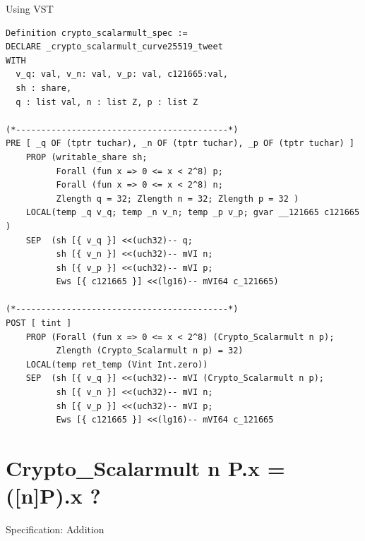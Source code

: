 \documentclass[8pt]{beamer}
\begin{document}
\begin{frame}[fragile]{Using VST}
\begin{lstlisting}[language=CoqVST]
Definition crypto_scalarmult_spec :=
DECLARE _crypto_scalarmult_curve25519_tweet
WITH
  v_q: val, v_n: val, v_p: val, c121665:val,
  sh : share,
  q : list val, n : list Z, p : list Z

(*------------------------------------------*)
PRE [ _q OF (tptr tuchar), _n OF (tptr tuchar), _p OF (tptr tuchar) ]
    PROP (writable_share sh;
          Forall (fun x => 0 <= x < 2^8) p;
          Forall (fun x => 0 <= x < 2^8) n;
          Zlength q = 32; Zlength n = 32; Zlength p = 32 )
    LOCAL(temp _q v_q; temp _n v_n; temp _p v_p; gvar __121665 c121665 )
    SEP  (sh [{ v_q }] <<(uch32)-- q;
          sh [{ v_n }] <<(uch32)-- mVI n;
          sh [{ v_p }] <<(uch32)-- mVI p;
          Ews [{ c121665 }] <<(lg16)-- mVI64 c_121665)

(*------------------------------------------*)
POST [ tint ]
    PROP (Forall (fun x => 0 <= x < 2^8) (Crypto_Scalarmult n p);
          Zlength (Crypto_Scalarmult n p) = 32)
    LOCAL(temp ret_temp (Vint Int.zero))
    SEP  (sh [{ v_q }] <<(uch32)-- mVI (Crypto_Scalarmult n p);
          sh [{ v_n }] <<(uch32)-- mVI n;
          sh [{ v_p }] <<(uch32)-- mVI p;
          Ews [{ c121665 }] <<(lg16)-- mVI64 c_121665
\end{lstlisting}
\end{frame}

\section{Crypto\_Scalarmult n P.x = ([n]P).x ?}

\begin{frame}[fragile]{Specification: Addition}
\begin{center}
\begin{lstlisting}[language=Coq]

\end{lstlisting}
\end{center}
\end{frame}

\end{document}
